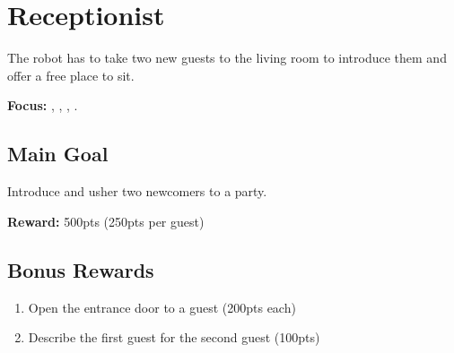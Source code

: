 \section{Receptionist}
\label{test:receptionist}
The robot has to take two new guests to the living room to introduce them and offer a free place to sit.

\noindent \textbf{Focus:} \SysI{}, \HRI{}, \PerDet{}, \PerRec.

\vspace{-5pt} %
\subsection*{Main Goal}
Introduce and usher two newcomers to a party.

\noindent\textbf{Reward:} 500pts (250pts per guest)

\vspace{-5pt}
\subsection*{Bonus Rewards}
\begin{enumerate}[nosep]
	\item Open the entrance door to a guest (200pts each)
	\item Describe the first guest for the second guest  (100pts)
\end{enumerate}


